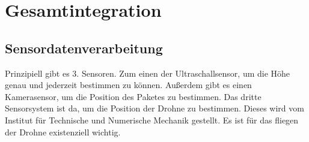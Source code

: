 \chapter{Gesamtintegration}

\section{Sensordatenverarbeitung}
Prinzipiell gibt es 3. Sensoren. Zum einen der Ultraschallsensor, um die Höhe genau und jederzeit bestimmen zu können. Außerdem gibt es einen Kamerasensor, um die Position des Paketes zu bestimmen. Das dritte Sensorsystem ist da, um die Position der Drohne zu bestimmen. Dieses wird vom Institut für Technische und Numerische Mechanik gestellt. Es ist für das fliegen der Drohne existenziell wichtig.

